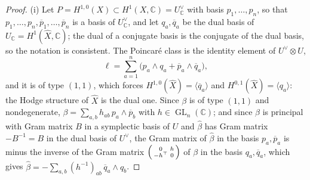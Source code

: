 \documentclass[11pt,reqno]{amsart}
\theoremstyle{plain}
\theoremstyle{definition}
\theoremstyle{remark}
\newcommand{\CC}{\mathbb{C}}
\DeclareMathOperator{\GL}{GL}
\newcommand{\bbar}[1]{\overline{#1}}
\begin{document}
\begin{proof}
(i) Let $P=H^{1,0}(X)\subset H^{1}(X,\CC)=U^{\vee}_{\CC}$ with basis
$p_{1},\dots,p_{n}$, so that $p_{1},\dots,p_{n},\bbar p_{1},\dots,\bbar p_{n}$
is a basis of $U^{\vee}_{\CC}$, and let $q_{a},\bbar q_{a}$ be the dual basis
of $U_{\CC}=H^{1}(\widehat X,\CC)$; the dual of a conjugate basis is the
conjugate of the dual basis, so the notation is consistent. The Poincar\'e
class is the identity element of $U^{\vee}\otimes U$,
\[
  \ell=\sum_{a=1}^{n}\bigl(p_{a}\wedge q_{a}+\bbar p_{a}\wedge\bbar q_{a}\bigr),
\]
and it is of type $(1,1)$, which forces $H^{1,0}(\widehat X)=\langle\bbar
q_{a}\rangle$ and $H^{0,1}(\widehat X)=\langle q_{a}\rangle$: the Hodge
structure of $\widehat X$ is the dual one. Since $\beta$ is of type $(1,1)$
and nondegenerate, $\beta=\sum_{a,b}h_{ab}\,p_{a}\wedge\bbar p_{b}$ with
$h\in\GL_{n}(\CC)$; and since $\beta$ is principal with Gram matrix $B$ in a
symplectic basis of $U$ and $\widehat\beta$ has Gram matrix $-B^{-1}=B$ in
the dual basis of $U^{\vee}$, the Gram matrix of $\widehat\beta$ in the
basis $p_{a},\bbar p_{a}$ is minus the inverse of the Gram matrix
$\begin{psmallmatrix}0&h\\-h^{\top}&0\end{psmallmatrix}$ of $\beta$ in the
basis $q_{a},\bbar q_{a}$, which gives
$\widehat\beta=-\sum_{a,b}(h^{-1})_{ab}\,\bbar q_{a}\wedge q_{b}$.


\end{proof}
\end{document}
